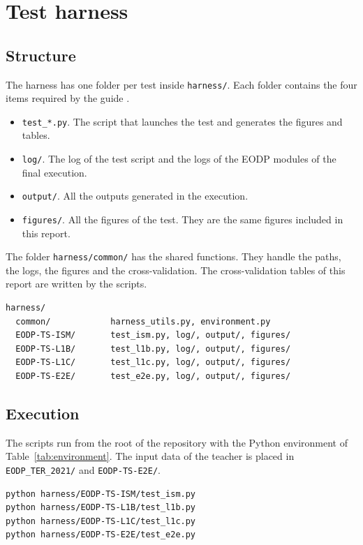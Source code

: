 \section{Test harness}
\label{sec:harness}

\subsection{Structure}
The harness has one folder per test inside \texttt{harness/}.
Each folder contains the four items required by the guide \cite{guide}.

\begin{itemize}
\item \texttt{test\_*.py}. The script that launches the test and generates the figures and tables.
\item \texttt{log/}. The log of the test script and the logs of the EODP modules of the final execution.
\item \texttt{output/}. All the outputs generated in the execution.
\item \texttt{figures/}. All the figures of the test. They are the same figures included in this report.
\end{itemize}

The folder \texttt{harness/common/} has the shared functions.
They handle the paths, the logs, the figures and the cross-validation.
The cross-validation tables of this report are written by the scripts.

\begin{lstlisting}
harness/
  common/            harness_utils.py, environment.py
  EODP-TS-ISM/       test_ism.py, log/, output/, figures/
  EODP-TS-L1B/       test_l1b.py, log/, output/, figures/
  EODP-TS-L1C/       test_l1c.py, log/, output/, figures/
  EODP-TS-E2E/       test_e2e.py, log/, output/, figures/
\end{lstlisting}

\subsection{Execution}
The scripts run from the root of the repository with the Python environment of Table~\ref{tab:environment}.
The input data of the teacher is placed in \texttt{EODP\_TER\_2021/} and \texttt{EODP-TS-E2E/}.

\begin{lstlisting}
python harness/EODP-TS-ISM/test_ism.py
python harness/EODP-TS-L1B/test_l1b.py
python harness/EODP-TS-L1C/test_l1c.py
python harness/EODP-TS-E2E/test_e2e.py
\end{lstlisting}

